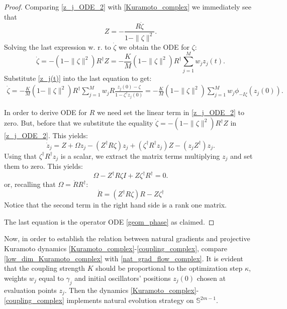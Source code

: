 \documentclass{article}
\theoremstyle{plain}%
\theoremstyle{definition}
\theoremstyle{remark}
\theoremstyle{prop}
\begin{document}
\begin{proof}
Comparing \eqref{z_j_ODE_2} with \eqref{Kuramoto_complex} we immediately see that 
\begin{equation}
\label{Z}
Z = - \frac{R \dot \zeta}{1 - \| \zeta \|^2}.
\end{equation}
Solving the last expression w. r. to $\dot \zeta$ we obtain the ODE  for $\zeta$:
$$
\dot \zeta = - (1 - \| \zeta \|^2) R^\dagger Z = - \frac{K}{M} (1 - \| \zeta \|^2) R^\dagger \sum_{j=1}^M w_j z_j(t).
$$
Substitute \eqref{z_j(t)} into the last equation to get:
\begin{equation}
\label{zeta}
\begin{split}
 \dot \zeta = - \frac{K}{M} (1 - \| \zeta \|^2) R^\dagger \sum_{j=1}^M w_j R \frac{z_j(0) - \zeta}{1 - \zeta^\dagger z_j(0)}
 = - \frac{K}{M} (1- \| \zeta \|^2) \sum_{j=1}^M w_j \phi_{-I \zeta}(z_j(0)).
\end{split}
\end{equation}

In order to derive ODE for $R$ we need set the linear term in \eqref{z_j_ODE_2} to zero. But, before that we substitute the equality $\dot \zeta = - (1 - \| \zeta \|^2)R^\dagger Z$ in \eqref{z_j_ODE_2}. This yields:
\begin{equation}
\label{z_j_ODE3}
\dot z_j = Z + \Omega z_j - (Z^\dagger R \zeta) z_j + (\zeta^\dagger R^\dagger z_j) Z - (z_j Z^\dagger) z_j.
\end{equation}
Using that $\zeta^\dagger R^\dagger z_j$ is a scalar, we extract the matrix terms multiplying $z_j$ and set them to zero. This yields:
$$
\Omega - Z^\dagger R \zeta I + Z \zeta^\dagger R^\dagger = 0.
$$
or, recalling that $\Omega = \dot R R^\dagger$: 
$$
\dot R = (Z^\dagger R \zeta) R - Z \zeta^\dagger 
$$
Notice that the second term in the right hand side is a rank one matrix.

The last equation is the operator ODE \eqref{geom_phase} as claimed.
\end{proof}

Now, in order to establish the relation between natural gradients and projective Kuramoto dynamics \eqref{Kuramoto_complex}-\eqref{coupling_complex}, compare \eqref{low_dim_Kuramoto_complex} with \eqref{nat_grad_flow_complex}.
It is evident that the coupling strength $K$ should be proportional to the optimization step $\kappa$, weights $w_j$ equal to $\gamma_j$ and initial oscillators' positions $z_j(0)$ chosen at evaluation points $z_j$. Then the dynamics \eqref{Kuramoto_complex}-\eqref{coupling_complex} implements natural evolution strategy on $\mathbb S^{2m-1}$.
\end{document}
